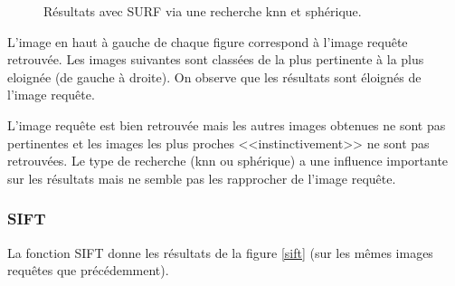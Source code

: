 \documentclass{article}
\begin{document}
\begin{figure}[!ht]%
  \centering
  \hspace{0.01\textwidth}
  \caption{Résultats avec SURF via une recherche knn et sphérique.}
  \label{surf}
\end{figure}

L'image en haut à gauche de chaque figure correspond à l'image requête retrouvée. Les images suivantes sont
classées de la plus pertinente à la plus eloignée (de gauche à droite).
On observe que les résultats sont éloignés de l'image requête. 

L'image requête est bien retrouvée mais les autres images obtenues ne sont pas pertinentes et les images les
plus proches <<instinctivement>> ne sont pas retrouvées. 
Le type de recherche (knn ou sphérique) a une influence importante sur les résultats mais ne semble pas les rapprocher de l'image requête. 

\subsubsection{SIFT}

La fonction SIFT donne les résultats de la figure \ref{sift} (sur les mêmes images requêtes que précédemment).
\end{document}
